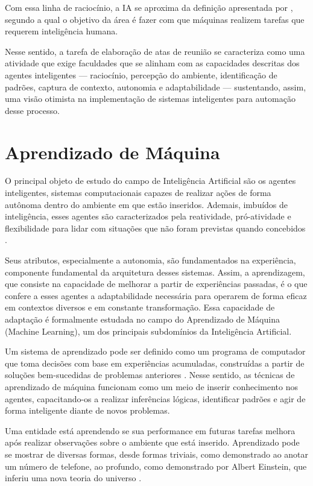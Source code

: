 Com essa linha de raciocínio, a IA se aproxima da definição apresentada por , segundo a qual o objetivo da área é fazer com que máquinas realizem tarefas que requerem inteligência humana.

Nesse sentido, a tarefa de elaboração de atas de reunião se caracteriza como uma atividade que exige faculdades que se alinham com as capacidades descritas dos agentes inteligentes --- raciocínio, percepção do ambiente, identificação de padrões, captura de contexto, autonomia e adaptabilidade --- sustentando, assim, uma visão otimista na implementação de sistemas inteligentes para automação desse processo.

\section{Aprendizado de Máquina}
\label{sec:aprendizado-de-maquina}

O principal objeto de estudo do campo de Inteligência Artificial são os agentes inteligentes, sistemas computacionais capazes de realizar ações de forma autônoma dentro do ambiente em que estão inseridos. Ademais, imbuídos de inteligência, esses agentes são caracterizados pela reatividade, pró-atividade e flexibilidade para lidar com situações que não foram previstas quando concebidos \cite{weiss_multiagent_2001}.

Seus atributos, especialmente a autonomia, são fundamentados na experiência, componente fundamental da arquitetura desses sistemas. Assim, a aprendizagem, que consiste na capacidade de melhorar a partir de experiências passadas, é o que confere a esses agentes a adaptabilidade necessária para operarem de forma eficaz em contextos diversos e em constante transformação. Essa capacidade de adaptação é formalmente estudada no campo do Aprendizado de Máquina (Machine Learning), um dos principais subdomínios da Inteligência Artificial.

Um sistema de aprendizado pode ser definido como um programa de computador que toma decisões com base em experiências acumuladas, construídas a partir de soluções bem-sucedidas de problemas anteriores \cite{rezende_sistemas_2003}. Nesse sentido, as técnicas de aprendizado de máquina funcionam como um meio de inserir conhecimento nos agentes, capacitando-os a realizar inferências lógicas, identificar padrões e agir de forma inteligente diante de novos problemas.

Uma entidade está aprendendo se sua performance em futuras tarefas melhora após realizar observações sobre o ambiente que está inserido. Aprendizado pode se mostrar de diversas formas, desde formas triviais, como demonstrado ao anotar um número de telefone, ao profundo, como demonstrado por Albert Einstein, que inferiu uma nova teoria do universo \cite{russell_artificial_2016}.

